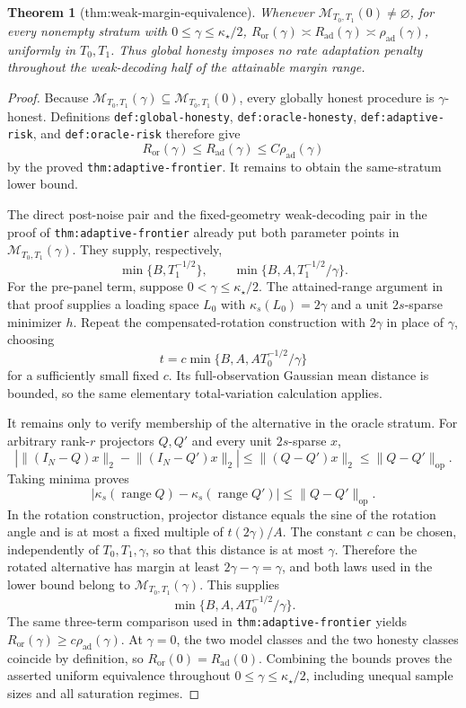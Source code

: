 \documentclass{article}
\newtheorem{theorem}{Theorem}
\begin{document}
\begin{theorem}[thm:weak-margin-equivalence]\label{thm:weak-margin-equivalence}
Whenever \(\mathcal M_{T_0,T_1}(0)\ne\varnothing\), for every nonempty stratum with \(0\le\gamma\le\kappa_\star/2\), \(R_{\mathrm{or}}(\gamma)\asymp R_{\mathrm{ad}}(\gamma)\asymp\rho_{\mathrm{ad}}(\gamma)\), uniformly in \(T_0,T_1\). Thus global honesty imposes no rate adaptation penalty throughout the weak-decoding half of the attainable margin range.
\end{theorem}
\begin{proof}
Because \(\mathcal M_{T_0,T_1}(\gamma)\subseteq\mathcal M_{T_0,T_1}(0)\), every globally honest procedure is \(\gamma\)-honest.  Definitions \texttt{def:global-honesty}, \texttt{def:oracle-honesty}, \texttt{def:adaptive-risk}, and \texttt{def:oracle-risk} therefore give
\[
 R_{\mathrm{or}}(\gamma)\le R_{\mathrm{ad}}(\gamma)
 \le C\rho_{\mathrm{ad}}(\gamma)
\]
by the proved \texttt{thm:adaptive-frontier}.  It remains to obtain the same-stratum lower bound.

The direct post-noise pair and the fixed-geometry weak-decoding pair in the proof of \texttt{thm:adaptive-frontier} already put both parameter points in \(\mathcal M_{T_0,T_1}(\gamma)\).  They supply, respectively,
\[
 \min\{B,T_1^{-1/2}\},
 \qquad
 \min\{B,A,T_1^{-1/2}/\gamma\}.
\]
For the pre-panel term, suppose \(0<\gamma\le\kappa_\star/2\).  The attained-range argument in that proof supplies a loading space \(L_0\) with \(\kappa_s(L_0)=2\gamma\) and a unit \(2s\)-sparse minimizer \(h\).  Repeat the compensated-rotation construction with \(2\gamma\) in place of \(\gamma\), choosing
\[
 t=c\min\{B,A,AT_0^{-1/2}/\gamma\}
\]
for a sufficiently small fixed \(c\).  Its full-observation Gaussian mean distance is bounded, so the same elementary total-variation calculation applies.

It remains only to verify membership of the alternative in the oracle stratum.  For arbitrary rank-\(r\) projectors \(Q,Q'\) and every unit \(2s\)-sparse \(x\),
\[
 \left|\lVert(I_N-Q)x\rVert_2-\lVert(I_N-Q')x\rVert_2\right|
 \le\lVert(Q-Q')x\rVert_2
 \le\lVert Q-Q'\rVert_{\mathrm{op}}.
\]
Taking minima proves
\[
 |\kappa_s(\operatorname{range}Q)-\kappa_s(\operatorname{range}Q')|
 \le\lVert Q-Q'\rVert_{\mathrm{op}}.
\]
In the rotation construction, projector distance equals the sine of the rotation angle and is at most a fixed multiple of \(t(2\gamma)/A\).  The constant \(c\) can be chosen, independently of \(T_0,T_1,\gamma\), so that this distance is at most \(\gamma\).  Therefore the rotated alternative has margin at least \(2\gamma-\gamma=\gamma\), and both laws used in the lower bound belong to \(\mathcal M_{T_0,T_1}(\gamma)\).  This supplies
\[
 \min\{B,A,AT_0^{-1/2}/\gamma\}.
\]
The same three-term comparison used in \texttt{thm:adaptive-frontier} yields \(R_{\mathrm{or}}(\gamma)\ge c\rho_{\mathrm{ad}}(\gamma)\).  At \(\gamma=0\), the two model classes and the two honesty classes coincide by definition, so \(R_{\mathrm{or}}(0)=R_{\mathrm{ad}}(0)\).  Combining the bounds proves the asserted uniform equivalence throughout \(0\le\gamma\le\kappa_\star/2\), including unequal sample sizes and all saturation regimes.
\end{proof}
\end{document}

